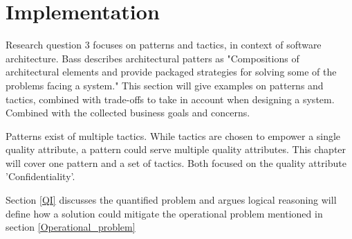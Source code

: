 \chapter{Implementation}\label{s:Implementation}
Research question 3 focuses on patterns and tactics, in context of software architecture. Bass \etal \cite{Bass2015SoftwareAI} describes architectural patters as "Compositions of architectural elements and provide packaged strategies for solving some of the problems facing a system." This section will give examples on patterns and tactics, combined with trade-offs to take in account when designing a system. Combined with the collected business goals and concerns.

Patterns exist of multiple tactics. While tactics are chosen to empower a single quality attribute, a pattern could serve multiple quality attributes. This chapter will cover one pattern and a set of tactics. Both focused on the quality attribute 'Confidentiality'.

Section \ref{QI} discusses the quantified problem and argues logical reasoning will define how a solution could mitigate the operational problem mentioned in section \ref{Operational_problem}
